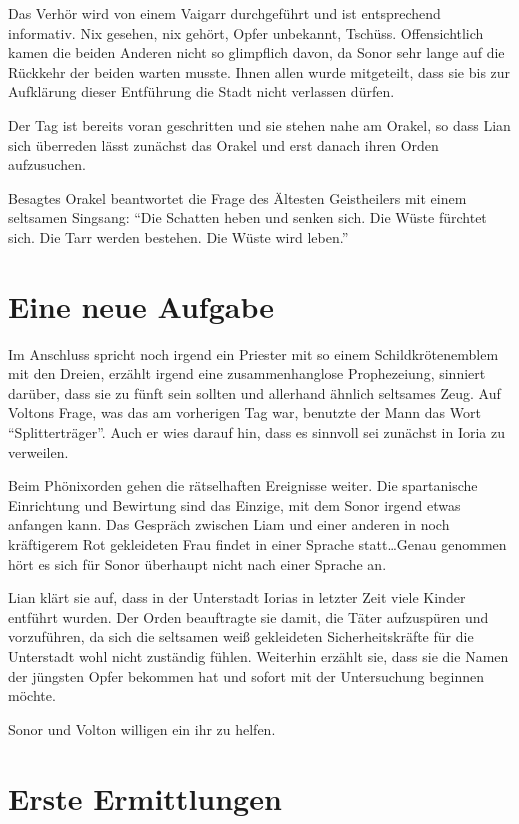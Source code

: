\documentclass[a4paper]{scrreprt}
\begin{document}
Das Verhör wird von einem Vaigarr durchgeführt und ist entsprechend informativ. Nix gesehen, nix gehört, Opfer unbekannt, Tschüss.
Offensichtlich kamen die beiden Anderen nicht so glimpflich davon, da Sonor sehr lange auf die Rückkehr der beiden warten musste.
Ihnen allen wurde mitgeteilt, dass sie bis zur Aufklärung dieser Entführung die Stadt nicht verlassen dürfen.

Der Tag ist bereits voran geschritten und sie stehen nahe am Orakel, so dass Lian sich überreden lässt zunächst das Orakel und erst danach ihren Orden aufzusuchen.

Besagtes Orakel beantwortet die Frage des Ältesten Geistheilers mit einem seltsamen Singsang:
\enquote{Die Schatten heben und senken sich. Die Wüste fürchtet sich. Die Tarr werden bestehen. Die Wüste wird leben.}


\section{Eine neue Aufgabe}

Im Anschluss spricht noch irgend ein Priester mit so einem Schildkrötenemblem mit den Dreien, erzählt irgend eine zusammenhanglose Prophezeiung, sinniert darüber, dass sie zu fünft sein sollten und allerhand ähnlich seltsames Zeug.
Auf Voltons Frage, was das am vorherigen Tag war, benutzte der Mann das Wort \enquote{Splitterträger}. 
Auch er wies darauf hin, dass es sinnvoll sei zunächst in Ioria zu verweilen.

Beim Phönixorden gehen die rätselhaften Ereignisse weiter. Die spartanische Einrichtung und Bewirtung sind das Einzige, mit dem Sonor irgend etwas anfangen kann. Das Gespräch zwischen Liam und einer anderen in noch kräftigerem Rot gekleideten Frau findet in einer Sprache statt\ldots Genau genommen hört es sich für Sonor überhaupt nicht nach einer Sprache an.

Lian klärt sie auf, dass in der Unterstadt Iorias in letzter Zeit viele Kinder entführt wurden. Der Orden beauftragte sie damit, die Täter aufzuspüren und vorzuführen, da sich die seltsamen weiß gekleideten Sicherheitskräfte für die Unterstadt wohl nicht zuständig fühlen.
Weiterhin erzählt sie, dass sie die Namen der jüngsten Opfer bekommen hat und sofort mit der Untersuchung beginnen möchte.

Sonor und Volton willigen ein ihr zu helfen.


\section{Erste Ermittlungen}
\end{document}
